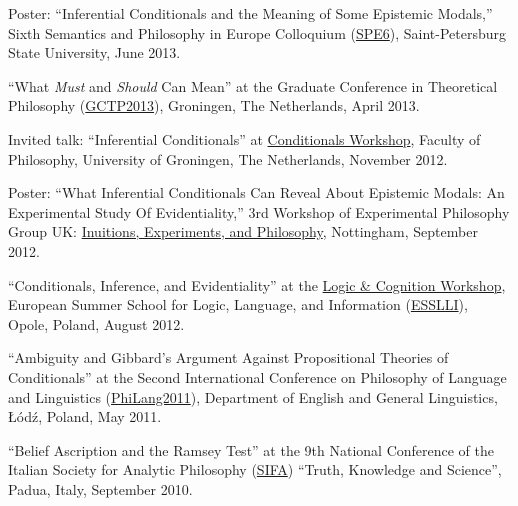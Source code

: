 \documentclass[11pt,article,oneside]{memoir}
\begin{document}
\begin{itemize}
	\ind Poster: ``Inferential Conditionals and the Meaning of Some  Epistemic Modals,'' Sixth Semantics and Philosophy in Europe Colloquium (\href{http://spe6conference.wordpress.com}{SPE6}), Saint-Petersburg State University, June 2013.
  
    
    \ind ``What \emph{Must} and \emph{Should} Can Mean'' at the Graduate Conference in Theoretical Philosophy (\href{http://www.philos.rug.nl/GCTP2013/}{GCTP2013}), Groningen, The Netherlands, April 2013. 
    

    \ind Invited talk: ``Inferential Conditionals'' at \href{https://sites.google.com/site/jannekehuitink/workshop}{Conditionals Workshop}, Faculty of Philosophy, University of Groningen, The Netherlands, November 2012.

	\ind Poster: ``What Inferential Conditionals Can Reveal About Epistemic Modals: An Experimental Study Of Evidentiality,'' 3rd Workshop of Experimental Philosophy Group UK: \href{https://www.nottingham.ac.uk/philosophy/research/conferences/workshop-intuitions-experimentsandphilosophy.aspx}{Inuitions, Experiments, and Philosophy}, Nottingham, September 2012.

    \ind ``Conditionals, Inference, and Evidentiality'' at the \href{http://www.ai.rug.nl/SocialCognition/logic-cognition/}{Logic \& Cognition Workshop}, European Summer School for Logic, Language, and Information (\href{http://www.esslli2012.pl}{ESSLLI}), Opole, Poland, August 2012. 

    \ind ``Ambiguity and Gibbard's Argument Against Propositional Theories of Conditionals'' at the Second International Conference on Philosophy of Language and Linguistics (\href{http://ia.uni.lodz.pl/linguistics/events/philang-2011}{PhiLang2011}),  Department of English and General Linguistics, Łódź, Poland, May 2011. 

    \ind ``Belief Ascription and the Ramsey Test'' at the 9th National Conference of the Italian Society for Analytic Philosophy (\href{http://www.filosofia.lettere.unipd.it/analitica/sifa2010/}{SIFA}) ``Truth, Knowledge and Science'', Padua, Italy, September 2010. 
  

\end{itemize}
\end{document}
